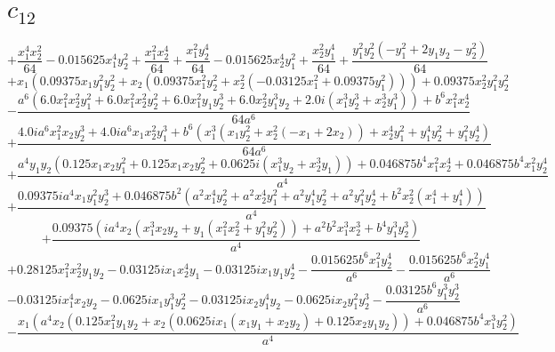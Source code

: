 \section{$c_{12}$}

$$+\frac{x_{1}^{4} x_{2}^{2}}{64} - 0.015625 x_{1}^{4} y_{2}^{2} + \frac{x_{1}^{2} x_{2}^{4}}{64} + \frac{x_{1}^{2} y_{2}^{4}}{64} - 0.015625 x_{2}^{4} y_{1}^{2} + \frac{x_{2}^{2} y_{1}^{4}}{64} + \frac{y_{1}^{2} y_{2}^{2} \left(- y_{1}^{2} + 2 y_{1} y_{2} - y_{2}^{2}\right)}{64}$$
$$+x_{1} \left(0.09375 x_{1} y_{1}^{2} y_{2}^{2} + x_{2} \left(0.09375 x_{1}^{2} y_{2}^{2} + x_{2}^{2} \left(- 0.03125 x_{1}^{2} + 0.09375 y_{1}^{2}\right)\right)\right) + 0.09375 x_{2}^{2} y_{1}^{2} y_{2}^{2}$$
$$- \frac{a^{6} \left(6.0 x_{1}^{2} x_{2}^{2} y_{1}^{2} + 6.0 x_{1}^{2} x_{2}^{2} y_{2}^{2} + 6.0 x_{1}^{2} y_{1} y_{2}^{3} + 6.0 x_{2}^{2} y_{1}^{3} y_{2} + 2.0 i \left(x_{1}^{3} y_{2}^{3} + x_{2}^{3} y_{1}^{3}\right)\right) + b^{6} x_{1}^{2} x_{2}^{4}}{64 a^{6}}$$
$$+\frac{4.0 i a^{6} x_{1}^{2} x_{2} y_{2}^{3} + 4.0 i a^{6} x_{1} x_{2}^{2} y_{1}^{3} + b^{6} \left(x_{1}^{3} \left(x_{1} y_{2}^{2} + x_{2}^{2} \left(- x_{1} + 2 x_{2}\right)\right) + x_{2}^{4} y_{1}^{2} + y_{1}^{4} y_{2}^{2} + y_{1}^{2} y_{2}^{4}\right)}{64 a^{6}}$$
$$+\frac{a^{4} y_{1} y_{2} \left(0.125 x_{1} x_{2} y_{1}^{2} + 0.125 x_{1} x_{2} y_{2}^{2} + 0.0625 i \left(x_{1}^{3} y_{2} + x_{2}^{3} y_{1}\right)\right) + 0.046875 b^{4} x_{1}^{2} x_{2}^{4} + 0.046875 b^{4} x_{1}^{2} y_{2}^{4}}{a^{4}}$$
$$+\frac{0.09375 i a^{4} x_{1} y_{1}^{2} y_{2}^{3} + 0.046875 b^{2} \left(a^{2} x_{1}^{4} y_{2}^{2} + a^{2} x_{2}^{4} y_{1}^{2} + a^{2} y_{1}^{4} y_{2}^{2} + a^{2} y_{1}^{2} y_{2}^{4} + b^{2} x_{2}^{2} \left(x_{1}^{4} + y_{1}^{4}\right)\right)}{a^{4}}$$
$$+\frac{0.09375 \left(i a^{4} x_{2} \left(x_{1}^{3} x_{2} y_{2} + y_{1} \left(x_{1}^{2} x_{2}^{2} + y_{1}^{2} y_{2}^{2}\right)\right) + a^{2} b^{2} x_{1}^{3} x_{2}^{3} + b^{4} y_{1}^{3} y_{2}^{3}\right)}{a^{4}}$$
$$+0.28125 x_{1}^{2} x_{2}^{2} y_{1} y_{2} - 0.03125 i x_{1} x_{2}^{4} y_{1} - 0.03125 i x_{1} y_{1} y_{2}^{4} - \frac{0.015625 b^{6} x_{1}^{2} y_{2}^{4}}{a^{6}} - \frac{0.015625 b^{6} x_{2}^{2} y_{1}^{4}}{a^{6}}$$
$$- 0.03125 i x_{1}^{4} x_{2} y_{2} - 0.0625 i x_{1} y_{1}^{3} y_{2}^{2} - 0.03125 i x_{2} y_{1}^{4} y_{2} - 0.0625 i x_{2} y_{1}^{2} y_{2}^{3} - \frac{0.03125 b^{6} y_{1}^{3} y_{2}^{3}}{a^{6}}$$
$$- \frac{x_{1} \left(a^{4} x_{2} \left(0.125 x_{1}^{2} y_{1} y_{2} + x_{2} \left(0.0625 i x_{1} \left(x_{1} y_{1} + x_{2} y_{2}\right) + 0.125 x_{2} y_{1} y_{2}\right)\right) + 0.046875 b^{4} x_{1}^{3} y_{2}^{2}\right)}{a^{4}}$$
